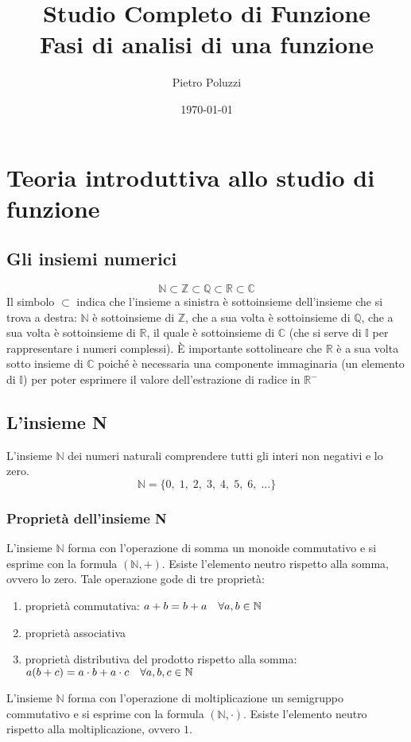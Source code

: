 \documentclass[a4paper,14pt]{extarticle}
\title{Studio Completo di Funzione \\ \large Fasi di analisi di una funzione}
\author{Pietro Poluzzi}
\date{\today}
\newcommand{\N}{\mathbb{N}}
\newcommand{\R}{\mathbb{R}}
\newcommand{\Z}{\mathbb{Z}}
\newcommand{\Q}{\mathbb{Q}}
\newcommand{\I}{\mathbb{I}}
\newcommand{\C}{\mathbb{C}}
\begin{document}
\maketitle
\normalsize

\tableofcontents

\newpage

\section{Teoria introduttiva allo studio di funzione}
\subsection{Gli insiemi numerici}
\[ \N \subset \Z \subset \Q \subset \R \subset \C \]
Il simbolo $\subset$ indica che l'insieme a sinistra è sottoinsieme dell'insieme che si trova a destra: $\N$ è sottoinsieme di $\Z$, che a sua volta è sottoinsieme di $\Q$, che a sua volta è sottoinsieme di $\R$, il quale è sottoinsieme di $\C$ (che si serve di $\I$ per rappresentare i numeri complessi). \newline
\`{E} importante sottolineare che $\R$ è a sua volta sotto insieme di $\C$ poiché è necessaria una componente immaginaria (un elemento di $\I$) per poter esprimere il valore dell'estrazione di radice in $\R^-$
\subsection{L'insieme N}
L'insieme $\N$ dei numeri naturali comprendere tutti gli interi non negativi e lo zero. \[ \N = \{0,\;1,\;2,\;3,\;4,\;5,\;6,\;...\} \]
\subsubsection{Proprietà dell'insieme N}
L'insieme $\N$ forma con l'operazione di somma un monoide commutativo e si esprime con la formula $(\N, +)$. Esiste l'elemento neutro rispetto alla somma, ovvero lo zero. Tale operazione gode di tre proprietà:
\begin{enumerate}
    \item proprietà commutativa: $\\ a + b = b + a \quad \forall a, b \in \N$
    \item proprietà associativa
    \item proprietà distributiva del prodotto rispetto alla somma: $\\ a(b+c)=a \cdot b + a \cdot c \quad \forall a, b, c \in \N$
\end{enumerate}
L'insieme $\N$ forma con l'operazione di moltiplicazione un semigruppo commutativo e si esprime con la formula $(\N, \cdot)$. Esiste l'elemento neutro rispetto alla moltiplicazione, ovvero $1$.
\end{document}
